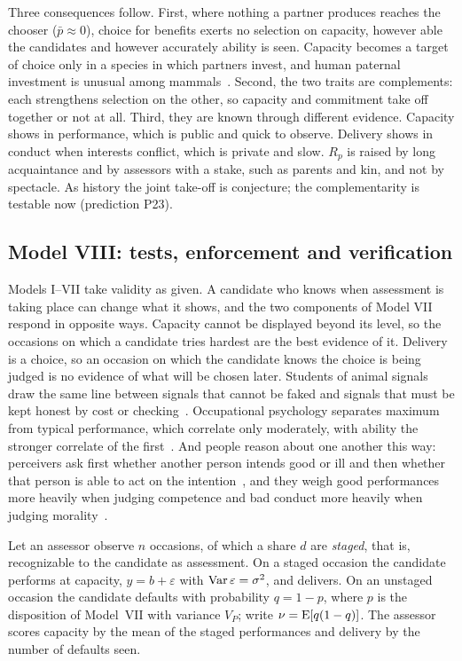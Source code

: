 Three consequences follow. First, where nothing a partner produces reaches the chooser ($\bar p\approx0$), choice for
benefits exerts no selection on capacity, however able the candidates and however accurately ability is seen. Capacity
becomes a target of choice only in a species in which partners invest, and human paternal investment is unusual among
mammals~\cite{geary2000,marlowe2000}. Second, the two traits are complements: each strengthens selection on the other, so
capacity and commitment take off together or not at all. Third, they are known through different evidence. Capacity shows in
performance, which is public and quick to observe. Delivery shows in conduct when interests conflict, which is private and
slow. $R_p$ is raised by long acquaintance and by assessors with a stake, such as parents and kin, and not by spectacle. As
history the joint take-off is conjecture; the complementarity is testable now (prediction P23).

\subsection{Model VIII: tests, enforcement and verification}\label{sec:verification}

Models I--VII take validity as given. A candidate who knows when assessment is taking place can change what it shows, and
the two components of Model VII respond in opposite ways. Capacity cannot be displayed beyond its level, so the occasions on
which a candidate tries hardest are the best evidence of it. Delivery is a choice, so an occasion on which the candidate
knows the choice is being judged is no evidence of what will be chosen later. Students of animal signals draw the same line
between signals that cannot be faked and signals that must be kept honest by cost or checking~\cite{maynardsmith1995,grafen1990}.
Occupational psychology separates maximum from typical performance, which correlate only moderately, with ability the
stronger correlate of the first~\cite{sackett1988,beus2012}. And people reason about one another this way: perceivers ask
first whether another person intends good or ill and then whether that person is able to act on the
intention~\cite{fiske2007}, and they weigh good performances more heavily when judging competence and bad conduct more
heavily when judging morality~\cite{reeder1979,skowronski1987,wojciszke1993}.

Let an assessor observe $n$ occasions, of which a share $d$ are \emph{staged}, that is, recognizable to the candidate as
assessment. On a staged occasion the candidate performs at capacity, $y=b+\varepsilon$ with $\operatorname{Var}\varepsilon=\sigma^2$, and
delivers. On an unstaged occasion the candidate defaults with probability $q=1-p$, where $p$ is the disposition of
Model~VII with variance $V_P$; write $\nu=\operatorname{E}[q(1-q)]$. The assessor scores capacity by the mean of the staged performances
and delivery by the number of defaults seen.

